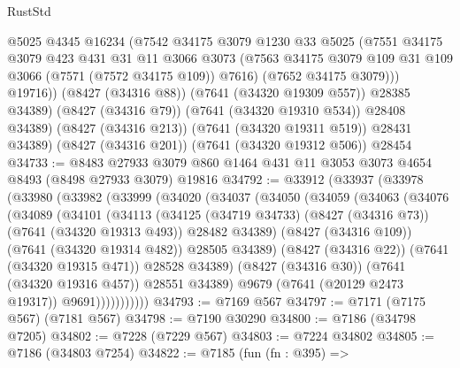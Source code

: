 \begin{lexlean}{RustStd}
\begin{coremodule}
{\begin{coremodule}
{{{{{{{{{{{{{{{{{{{{{{{{{{{{{{{{              @5025
              @4345
              @16234
              (@7542
                @34175
                @3079
                @1230
                @33
                @5025
                (@7551
                  @34175
                  @3079
                  @423
                  @431
                  @31
                  @11
                  @3066
                  @3073
                  (@7563 @34175 @3079 @109 @31 @109 @3066 (@7571 (@7572 @34175 @109)) @7616)
                  (@7652 @34175 @3079)))
              @19716))
          (@8427 (@34316 @88))
          (@7641 (@34320 @19309 @557))
          @28385
          @34389)
        (@8427 (@34316 @79))
        (@7641 (@34320 @19310 @534))
        @28408
        @34389)
      (@8427 (@34316 @213))
      (@7641 (@34320 @19311 @519))
      @28431
      @34389)
    (@8427 (@34316 @201))
    (@7641 (@34320 @19312 @506))
    @28454
@34733 := @8483 @27933 @3079 @860 @1464 @431 @11 @3053 @3073 @4654 @8493 (@8498 @27933 @3079) @19816
@34792 := @33912
    (@33937
      (@33978
        (@33980
          (@33982
            (@33999
              (@34020
                (@34037
                  (@34050
                    (@34059
                      (@34063
                        (@34076
                          (@34089
                            (@34101
                              (@34113
                                (@34125
                                  (@34719 @34733)
                                  (@8427 (@34316 @73))
                                  (@7641 (@34320 @19313 @493))
                                  @28482
                                  @34389)
                                (@8427 (@34316 @109))
                                (@7641 (@34320 @19314 @482))
                                @28505
                                @34389)
                              (@8427 (@34316 @22))
                              (@7641 (@34320 @19315 @471))
                              @28528
                              @34389)
                            (@8427 (@34316 @30))
                            (@7641 (@34320 @19316 @457))
                            @28551
                            @34389)
                          @9679
                          (@7641 (@20129 @2473 @19317))
                          @9691)))))))))))
@34793 := @7169 @567
@34797 := @7171 (@7175 @567) (@7181 @567)
@34798 := @7190 @30290
@34800 := @7186 (@34798 @7205)
@34802 := @7228 (@7229 @567)
@34803 := @7224 @34802
@34805 := @7186 (@34803 @7254)
@34822 := @7185
    (fun (fn : @395) =>
}}}}}}}}}}}}}}}}}}}}}}}}}}}}}}}}
\end{coremodule}}
\end{coremodule}
\end{lexlean}
